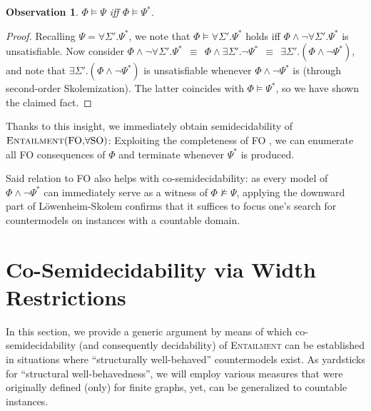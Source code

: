 \documentclass[10pt,a4paper]{amsart}
\theoremstyle{definition}
\numberwithin{equation}{section}
\theoremstyle{plain}
\newtheorem{observation}[observation]{Observation}
\theoremstyle{definition}
\theoremstyle{myexample}
\theoremstyle{plain}
\theoremstyle{definition}
\newcommand{\iffi}{\textit{iff} } %
\begin{document}
\begin{observation}
$\Phi \models \Psi$ \iffi $\Phi \models \Psi^*$.
\end{observation}
\begin{proof}
Recalling $\Psi = \forall\Sigma'.\Psi^*$, we note that $\Phi \models \forall\Sigma'.\Psi^*$ holds iff $\Phi \wedge  \neg \forall\Sigma'.\Psi^*$ is unsatisfiable. Now consider
$\Phi \wedge  \neg \forall\Sigma'.\Psi^* \ \ \equiv \ \ \Phi \wedge  \exists\Sigma'.\neg\Psi^* \ \ \equiv \ \ \exists\Sigma'.(\Phi \wedge  \neg\Psi^*),$
and note that $\exists\Sigma'.(\Phi \wedge  \neg\Psi^*)$ is unsatisfiable whenever $\Phi \wedge  \neg\Psi^*$ is (through second-order Skolemization). 
The latter coincides with $\Phi \models \Psi^*$, so we have shown the claimed fact.
\end{proof}

Thanks to this insight, we immediately obtain semidecidability of $\textsc{Entailment}(\mathrm{FO},\!\forall\mathrm{SO})$: Exploiting the completeness of FO \cite{God29FOLcomp}, we can enumerate all FO consequences of $\Phi$ and terminate whenever $\Psi^*$ is produced. 

Said relation to FO also helps with co-semidecidability: as every model of $\Phi \wedge \neg\Psi^*$ can immediately serve as a witness of $\Phi \not\models \Psi$, applying the downward part of Löwenheim-Skolem \cite{LSTheorem} confirms that it suffices to focus one's search for countermodels on instances with a countable domain.


\section{Co-Semidecidability via Width Restrictions}\label{sec:genericdecidability}

In this section, we provide a generic argument by means of which co-semidecidability (and consequently decidability) of \textsc{Entailment} can be established in situations where ``structurally well-behaved'' countermodels exist.  
As yardsticks for ``structural well-behavedness'', we will employ various measures that were originally defined (only) for finite graphs, yet, can be generalized to countable instances.  
\end{document}
